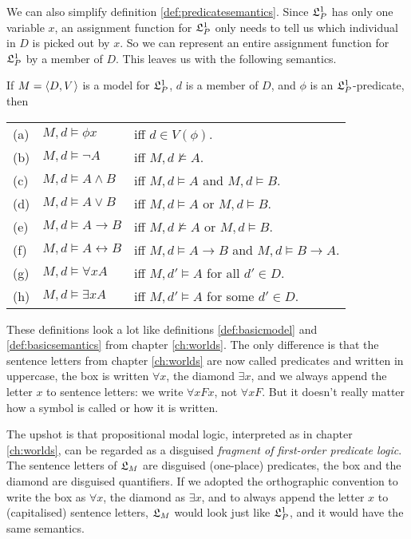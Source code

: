 We can also simplify definition \ref{def:predicatesemantics}. Since $\mathfrak{L}_P^1$ has
only one variable $x$, an assignment function for $\mathfrak{L}_P^1$ only needs to tell us
which individual in $D$ is picked out by $x$. So we can represent an entire
assignment function for $\mathfrak{L}_P^1$ by a member of $D$. This leaves us with the
following semantics.

\begin{justabox}
  If $M = \t{D,V}$ is a model for $\mathfrak{L}_P^1$, $d$ is a member of $D$, and $\phi$
  is an $\mathfrak{L}_{P}^{1}$-predicate, then
  
  \medskip
  \begin{tabular}{lll}
    (a) & $M,d \models \phi x$ &iff $d \in V(\phi)$.\\
    (b) & $M,d \models \neg A$ &iff $M,d \not\models A$.\\
    (c) & $M,d \models A \land B$ &iff $M,d \models A$ and $M,d \models B$.\\
    (d) & $M,d \models A \lor B$ &iff $M,d \models A$ or $M,d \models B$.\\
    (e) & $M,d \models A \to B$ &iff $M,d \not\models A$ or $M,d \models B$.\\
    (f) & $M,d \models A \leftrightarrow B$ &iff $M,d \models A\to B$ and $M,d \models B\to A$.\\
    (g) & $M,d \models \forall x A$ &iff $M,d' \models A$ for all $d' \in D$.\\
    (h) & $M,d \models \exists x A$ &iff $M,d' \models A$ for some $d' \in D$.
  \end{tabular}
\end{justabox}

These definitions look a lot like definitions \ref{def:basicmodel} and
\ref{def:basicsemantics} from chapter \ref{ch:worlds}. The only difference is
that the sentence letters from chapter \ref{ch:worlds} are now called predicates
and written in uppercase, the box is written $\forall x$, the diamond
$\exists x$, and we always append the letter $x$ to sentence letters: we write
$\forall x Fx$, not $\forall x F$. But it doesn't really matter how a symbol is
called or how it is written.

The upshot is that propositional modal logic, interpreted as in chapter
\ref{ch:worlds}, can be regarded as a disguised \emph{fragment of first-order
  predicate logic}. The sentence letters of $\mathfrak{L}_M$ are disguised (one-place)
predicates, the box and the diamond are disguised quantifiers. If we adopted the
orthographic convention to write the box as $\forall x$, the diamond as
$\exists x$, and to always append the letter $x$ to (capitalised) sentence
letters, $\mathfrak{L}_M$ would look just like $\mathfrak{L}_P^1$, and it would have the same
semantics.


